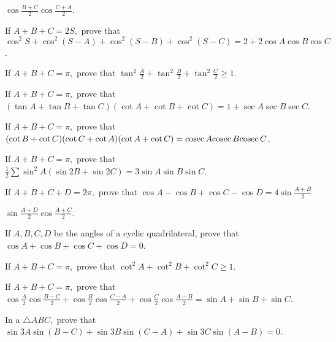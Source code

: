   $\cos\frac{B + C}{2}\cos\frac{C + A}{2}$.
\item If $A + B + C = 2S,$ prove that $\cos^2S + \cos^2(S - A) + \cos^2(S - B) + \cos^2(S - C) = 2 + 2\cos A\cos B\cos C$.
\item If $A + B + C = \pi,$ prove that $\tan^2\frac{A}{2} + \tan^2\frac{B}{2} + \tan^2\frac{C}{2}\geq 1$.
\item If $A + B + C = \pi,$ prove that $(\tan A + \tan B + \tan C)(\cot A + \cot B + \cot C) = 1 + \sec A\sec B\sec C$.
\item If $A + B + C = \pi,$ prove that $(\cot B + \cot C)(\cot C + \cot A)(\cot A + \cot C) = {\rm cosec}\,A{\rm cosec}\,B{\rm cosec}\,C$.
\item If $A + B + C = \pi,$ prove that $\frac{1}{2}\sum \sin^2A(\sin 2B + \sin 2C) = 3\sin A\sin B\sin C$.
\item If $A + B + C + D = 2\pi,$ prove that $\cos A - \cos B + \cos C - \cos D = 4\sin\frac{A + B}{2}$

  $\sin\frac{A + D}{2}\cos \frac{A + C}{2}$.
\item If $A, B, C, D$ be the angles of a cyclic quadrilateral, prove that $\cos A + \cos B + \cos C + \cos D = 0$.
\item If $A + B + C = \pi,$ prove that $\cot^2A + \cot^2B + \cot^2C \geq 1$.
\item If $A + B + C = \pi,$ prove that $\cos \frac{A}{2}\cos\frac{B - C}{2} + \cos\frac{B}{2}\cos\frac{C - A}{2} + \cos
  \frac{C}{2}\cos\frac{A -B}{2} = \sin A + \sin B + \sin C$.
\item In a $\triangle ABC,$ prove that $\sin 3A\sin(B - C) + \sin 3B\sin(C - A) + \sin3C\sin(A - B) = 0$.
\stopitemize
